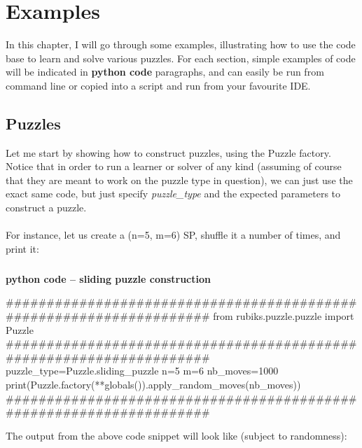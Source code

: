 
\chapter{Examples} %

\label{sec:Examples} %


In this chapter, I will go through some examples, illustrating how to use the code base to learn and solve various puzzles. For each section, simple examples of code will be indicated in \afblue \textbf{python code} \black paragraphs, and can easily be run from command line or copied into a script and run from your favourite IDE.






\section{Puzzles}
Let me start by showing how to construct puzzles, using the Puzzle factory. Notice that in order to run a learner or solver of any kind (assuming of course that they are meant to work on the puzzle type in question), we can just use the exact same code, but just specify \textit{puzzle\_type}  and the expected parameters to construct a puzzle.
\\
\\
For instance, let us create a (n=5, m=6) SP, shuffle it a number of times, and print it:
\afblue
\paragraph{}{\textbf{python code -- sliding puzzle construction}}
\begin{python}
####################################################################
from rubiks.puzzle.puzzle import Puzzle
####################################################################
puzzle_type=Puzzle.sliding_puzzle
n=5
m=6
nb_moves=1000
print(Puzzle.factory(**globals()).apply_random_moves(nb_moves))
####################################################################
\end{python}
\black
The output from the above code snippet will look like (subject to randomness):

